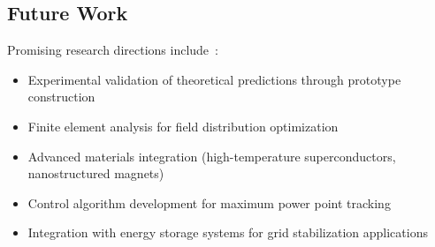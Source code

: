 \documentclass[12pt,a4paper]{article}
\begin{document}
\subsection{Future Work}
Promising research directions include~\cite{ref36,ref37}:

\begin{itemize}
\item Experimental validation of theoretical predictions through prototype construction
\item Finite element analysis for field distribution optimization~\cite{ref38}
\item Advanced materials integration (high-temperature superconductors, nanostructured magnets)~\cite{ref39,ref40}
\item Control algorithm development for maximum power point tracking~\cite{ref41}
\item Integration with energy storage systems for grid stabilization applications~\cite{ref42}
\end{itemize}
\end{document}
